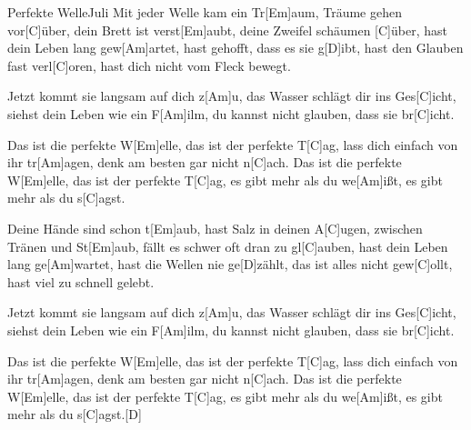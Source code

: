 \documentclass[../main.tex]{subfiles}
\begin{document}
\begin{song}[1]{Perfekte Welle}{Juli}{}
Mit jeder Welle kam ein Tr[Em]aum, Träume gehen vor[C]{ü}ber,
dein Brett ist verst[Em]aubt, deine Zweifel schäumen [C]{ü}ber,
hast dein Leben lang gew[Am]artet, hast gehofft, dass es sie g[D]ibt,
hast den Glauben fast verl[C]oren, hast dich nicht vom Fleck bewegt.

Jetzt kommt sie langsam auf dich z[Am]u, das Wasser schlägt dir ins Ges[C]icht,
siehst dein Leben wie ein F[Am]ilm, du kannst nicht glauben, dass sie br[C]icht.

Das ist die perfekte W[Em]elle, das ist der perfekte T[C]ag,
lass dich einfach von ihr tr[Am]agen, denk am besten gar nicht n[C]ach.
Das ist die perfekte W[Em]elle, das ist der perfekte T[C]ag,
es gibt mehr als du we[Am]ißt, es gibt mehr als du s[C]agst.

Deine Hände sind schon t[Em]aub, hast Salz in deinen A[C]ugen,
zwischen Tränen und St[Em]aub, fällt es schwer oft dran zu gl[C]auben,
hast dein Leben lang ge[Am]wartet, hast die Wellen nie ge[D]zählt,
das ist alles nicht gew[C]ollt, hast viel zu schnell gelebt.

Jetzt kommt sie langsam auf dich z[Am]u, das Wasser schlägt dir ins Ges[C]icht,
siehst dein Leben wie ein F[Am]ilm, du kannst nicht glauben, dass sie br[C]icht.

Das ist die perfekte W[Em]elle, das ist der perfekte T[C]ag,
lass dich einfach von ihr tr[Am]agen, denk am besten gar nicht n[C]ach.
Das ist die perfekte W[Em]elle, das ist der perfekte T[C]ag,
es gibt mehr als du we[Am]ißt, es gibt mehr als du s[C]agst.[D]{\hh}
\end{song}
\end{document}
